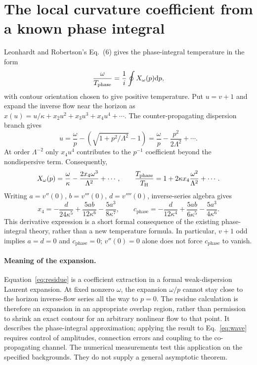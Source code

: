 \documentclass[10pt,a4paper]{article}
\newcommand{\HawkingT}{T_{\mathrm H}}
\newcommand{\cphase}{c_{\mathrm{phase}}}
\newcommand{\dd}{\mathrm d}
\begin{document}
\clearpage
\section{The local curvature coefficient from a known phase integral}
\label{sec:phase}
Leonhardt and Robertson's Eq.~(6) \cite{LR} gives the phase-integral
temperature in the form
\begin{equation}
 \frac{\omega}{T_{\rm phase}}=\frac{1}{i}\oint X_\omega(p)\dd p,
 \label{eq:phase}
\end{equation}
with contour orientation chosen to give positive temperature. Put
$u=v+1$ and expand the inverse flow near the horizon as
$x(u)=u/\kappa+x_2u^2+x_3u^3+x_4u^4+\cdots$.
The counter-propagating dispersion branch gives
\begin{equation}
 u=\frac{\omega}{p}-\left(\sqrt{1+p^2/\Lambda^2}-1\right)
 =\frac{\omega}{p}-\frac{p^2}{2\Lambda^2}+\cdots .
\end{equation}
At order $\Lambda^{-2}$ only $x_4u^4$ contributes to the $p^{-1}$
coefficient beyond the nondispersive term. Consequently,
\begin{equation}
 [p^{-1}]X_\omega(p)=\frac{\omega}{\kappa}
                    -\frac{2x_4\omega^3}{\Lambda^2}+\cdots,
 \qquad
 \frac{T_{\rm phase}}{\HawkingT}=1+2\kappa x_4\frac{\omega^2}{\Lambda^2}+\cdots .
 \label{eq:residue}
\end{equation}
Writing $a=v''(0)$, $b=v'''(0)$, $d=v''''(0)$, inverse-series algebra gives
\begin{equation}
 x_4=-\frac{d}{24\kappa^5}+\frac{5ab}{12\kappa^6}
                      -\frac{5a^3}{8\kappa^7},
 \qquad
 \boxed{\cphase=-\frac{d}{12\kappa^4}
                   +\frac{5ab}{6\kappa^5}-\frac{5a^3}{4\kappa^6}.}
 \label{eq:cphase}
\end{equation}
This derivative expression is a short formal consequence of the existing
phase-integral theory, rather than a new temperature formula. In
particular, $v+1$ odd implies $a=d=0$ and $\cphase=0$; $v''(0)=0$ alone
does not force $\cphase$ to vanish.

\paragraph{Meaning of the expansion.}
Equation~\eqref{eq:residue} is a coefficient extraction in a formal
weak-dispersion Laurent expansion. At fixed nonzero $\omega$, the
expansion $\omega/p$ cannot stay close to the horizon inverse-flow
series all the way to $p=0$. The residue calculation is therefore an
expansion in an appropriate overlap region, rather than permission
to shrink an exact contour for an arbitrary nonlinear flow to that point.
It describes the phase-integral approximation; applying the result to
Eq.~\eqref{eq:wave} requires control of amplitudes, connection errors and
coupling to the co-propagating channel. The numerical measurements test
this application on the specified backgrounds. They do not supply a
general asymptotic theorem.
\end{document}
